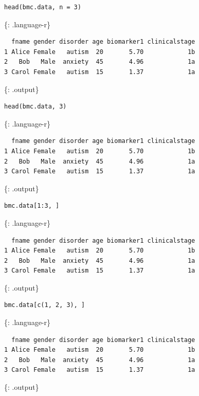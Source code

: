 \documentclass[]{article}
\begin{document}
\begin{verbatim}
head(bmc.data, n = 3)
\end{verbatim}

\{: .language-r\}

\begin{verbatim}
  fname gender disorder age biomarker1 clinicalstage
1 Alice Female   autism  20       5.70            1b
2   Bob   Male  anxiety  45       4.96            1a
3 Carol Female   autism  15       1.37            1a
\end{verbatim}

\{: .output\}

\begin{verbatim}
head(bmc.data, 3)
\end{verbatim}

\{: .language-r\}

\begin{verbatim}
  fname gender disorder age biomarker1 clinicalstage
1 Alice Female   autism  20       5.70            1b
2   Bob   Male  anxiety  45       4.96            1a
3 Carol Female   autism  15       1.37            1a
\end{verbatim}

\{: .output\}

\begin{verbatim}
bmc.data[1:3, ]
\end{verbatim}

\{: .language-r\}

\begin{verbatim}
  fname gender disorder age biomarker1 clinicalstage
1 Alice Female   autism  20       5.70            1b
2   Bob   Male  anxiety  45       4.96            1a
3 Carol Female   autism  15       1.37            1a
\end{verbatim}

\{: .output\}

\begin{verbatim}
bmc.data[c(1, 2, 3), ]
\end{verbatim}

\{: .language-r\}

\begin{verbatim}
  fname gender disorder age biomarker1 clinicalstage
1 Alice Female   autism  20       5.70            1b
2   Bob   Male  anxiety  45       4.96            1a
3 Carol Female   autism  15       1.37            1a
\end{verbatim}

\{: .output\}
\end{document}
